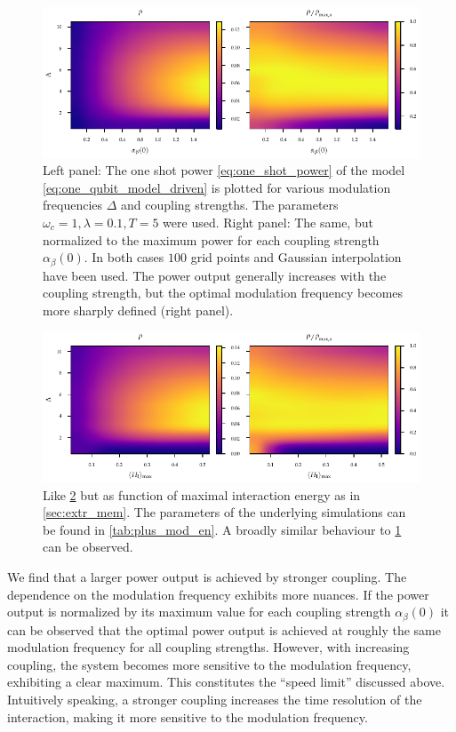 \begin{figure}[htp]
  \centering
  \includegraphics{figs/one_bath_mod/power_heatmap}
  \caption{\label{fig:power_heatmap} Left panel: The one shot power
    \cref{eq:one_shot_power} of the model
    \cref{eq:one_qubit_model_driven} is plotted for various modulation
    frequencies \(Δ\) and coupling strengths. The parameters
    \(ω_{c}=1,λ=0.1, T=5\) were used. Right panel: The same, but
    normalized to the maximum power for each coupling strength
    \(α_{β}(0)\). In both cases \(100\) grid points and Gaussian
    interpolation have been used. The power output generally increases
    with the coupling strength, but the optimal modulation frequency
    becomes more sharply defined (right panel).}
\end{figure}
\begin{figure}[htp]
  \centering
  \includegraphics{figs/one_bath_mod/power_en_heatmap}
  \caption{\label{fig:power_heatmap_tuned} Like
    \cref{fig:power_heatmap_tuned} but as function of maximal
    interaction energy as in \cref{sec:extr_mem}.  The parameters of
    the underlying simulations can be found in
    \cref{tab:plus_mod_en}. A broadly similar behaviour to
    \cref{fig:power_heatmap} can be observed.}
\end{figure}

We find that a larger power output is achieved by stronger
coupling. The dependence on the modulation frequency exhibits more
nuances. If the power output is normalized by its maximum value for
each coupling strength \(α_{β}(0)\) it can be observed that the
optimal power output is achieved at roughly the same modulation
frequency for all coupling strengths. However, with increasing
coupling, the system becomes more sensitive to the modulation
frequency, exhibiting a clear maximum. This constitutes the ``speed
limit'' discussed above. Intuitively speaking, a stronger coupling
increases the time resolution of the interaction, making it more
sensitive to the modulation frequency.

